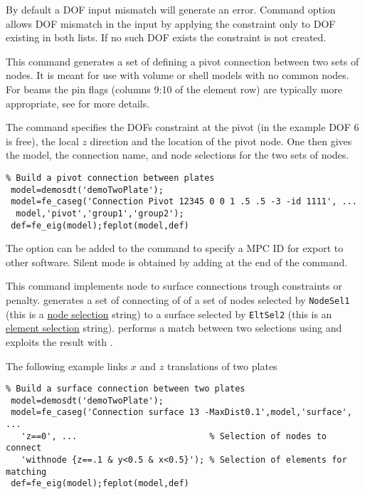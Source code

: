 \begin{SDT}
By default a DOF input mismatch will generate an error. Command option  allows DOF mismatch in the input by applying the constraint only to DOF existing in both lists. If no such DOF exists the constraint is not created.


This command generates a set of  defining a pivot connection between two sets of nodes. It is meant for use with volume or shell models with no common nodes. For beams the pin flags (columns 9:10 of the element row) are typically more appropriate, see \beam for more details.

The command specifies the DOFs constraint at the pivot (in the example DOF 6 is free), the local $z$ direction and the location of the pivot node. One then gives the model, the connection name, and node selections for the two sets of nodes. 

\begin{verbatim}
% Build a pivot connection between plates
 model=demosdt('demoTwoPlate');
 model=fe_caseg('Connection Pivot 12345 0 0 1 .5 .5 -3 -id 1111', ...
  model,'pivot','group1','group2');
 def=fe_eig(model);feplot(model,def)
\end{verbatim}%

The option  can be added to the command to specify a MPC ID {\ti {}} for export to other software. Silent mode is obtained by adding \ts{;} at the end of the command.


This command implements node to surface connections trough constraints or penalty.  generates a set of  connecting of  of a set of nodes selected by {\tt NodeSel1} (this is a \hyperlink{findnode}{node selection} string) to a surface selected by {\tt EltSel2} (this is an \hyperlink{findelt}{element selection} string).  performs a match between two selections using  and exploits the result with .

The following example links $x$ and $z$ translations of two plates

\begin{verbatim}
% Build a surface connection between two plates
 model=demosdt('demoTwoPlate');
 model=fe_caseg('Connection surface 13 -MaxDist0.1',model,'surface', ...
   'z==0', ...                          % Selection of nodes to connect
   'withnode {z==.1 & y<0.5 & x<0.5}'); % Selection of elements for matching
 def=fe_eig(model);feplot(model,def)
\end{verbatim}%



\end{SDT}
